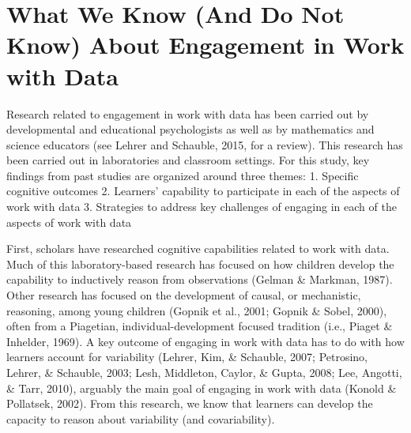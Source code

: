 \documentclass[]{msu-thesis}
\theoremstyle{definition}
\theoremstyle{definition}
\theoremstyle{definition}
\theoremstyle{remark}
\begin{document}
\section{What We Know (And Do Not Know) About Engagement in Work with
Data}\label{what-we-know-and-do-not-know-about-engagement-in-work-with-data}

Research related to engagement in work with data has been carried out by
developmental and educational psychologists as well as by mathematics
and science educators (see Lehrer and Schauble, 2015, for a review).
This research has been carried out in laboratories and classroom
settings. For this study, key findings from past studies are organized
around three themes: 1. Specific cognitive outcomes 2. Learners'
capability to participate in each of the aspects of work with data 3.
Strategies to address key challenges of engaging in each of the aspects
of work with data

First, scholars have researched cognitive capabilities related to work
with data. Much of this laboratory-based research has focused on how
children develop the capability to inductively reason from observations
(Gelman \& Markman, 1987). Other research has focused on the development
of causal, or mechanistic, reasoning, among young children (Gopnik et
al., 2001; Gopnik \& Sobel, 2000), often from a Piagetian,
individual-development focused tradition (i.e., Piaget \& Inhelder,
1969). A key outcome of engaging in work with data has to do with how
learners account for variability (Lehrer, Kim, \& Schauble, 2007;
Petrosino, Lehrer, \& Schauble, 2003; Lesh, Middleton, Caylor, \& Gupta,
2008; Lee, Angotti, \& Tarr, 2010), arguably the main goal of engaging
in work with data (Konold \& Pollatsek, 2002). From this research, we
know that learners can develop the capacity to reason about variability
(and covariability).
\end{document}
